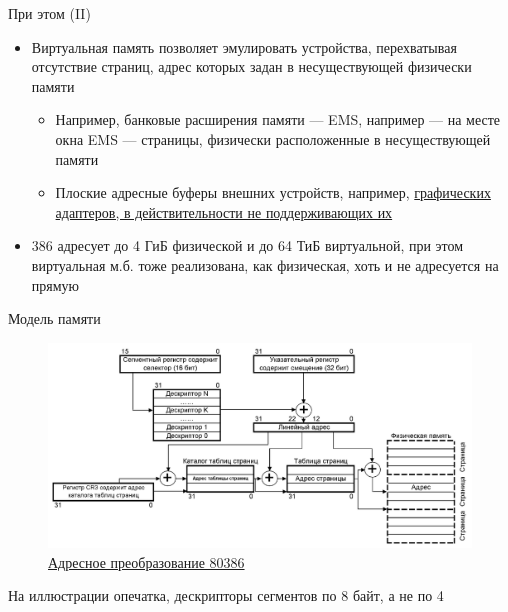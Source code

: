 \documentclass[xetex,aspectratio=43]{beamer}
\begin{document}
\begin{frame}{При этом (II)}
    \begin{itemize}
        \tightlist
        \item
        Виртуальная память позволяет эмулировать устройства, перехватывая
        отсутствие страниц, адрес которых задан в несуществующей физически
        памяти

        \begin{itemize}
            \tightlist
            \item
            Например, банковые расширения памяти --- EMS, например --- на месте
            окна EMS --- страницы, физически расположенные в несуществующей
            памяти
            \item
            Плоские адресные буферы внешних устройств, например,
            \href{http://ru.wikipedia.org/wiki/UniVBE}{графических адаптеров, в
                действительности не поддерживающих их}
        \end{itemize}
        \item
        386 адресует до 4 ГиБ физической и до 64 ТиБ виртуальной, при этом
        виртуальная м.б. тоже реализована, как физическая, хоть и не
        адресуется на прямую
    \end{itemize}
\end{frame}

\begin{frame}{Модель памяти}
    \begin{figure}
        \includegraphics[width=\textwidth]{img/06.I8386_Addres_Translation.png}
        \caption{\href{https://en.wikipedia.org/wiki/Protected_mode}{Адресное преобразование 80386}}
    \end{figure}

    На иллюстрации опечатка, дескрипторы сегментов по 8 байт, а не по 4
\end{frame}
\end{document}
